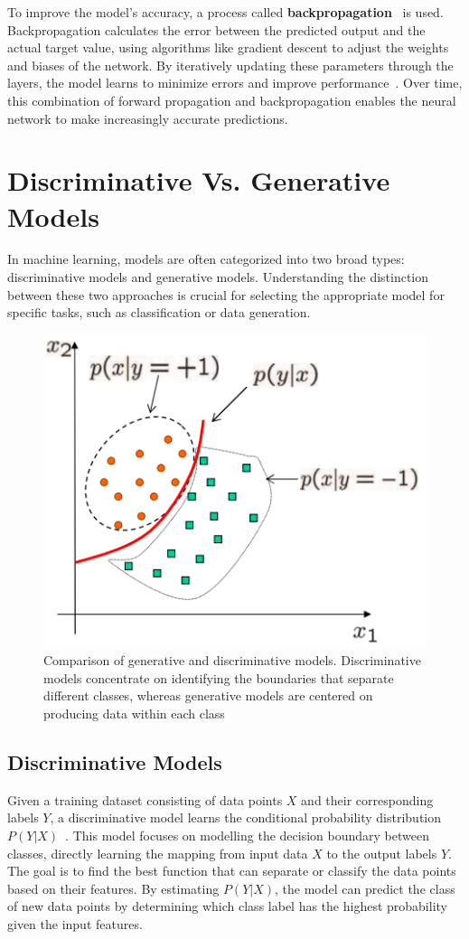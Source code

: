 \documentclass[12pt,DIV14,BCOR12mm,a4paper,footinclude=false,headinclude,parskip=half-,twoside,openright,cleardoublepage=empty,toc=index,bibliography=totoc,listof=totoc]{scrreprt}
\numberwithin{equation}{chapter}
\begin{document}
To improve the model's accuracy, a process called \textbf{backpropagation}~\cite{lecun1988theoretical} is used. Backpropagation calculates the error between the predicted output and the actual target value, using algorithms like gradient descent to adjust the weights and biases of the network. By iteratively updating these parameters through the layers, the model learns to minimize errors and improve performance~\cite{rumelhart1986learning}. Over time, this combination of forward propagation and backpropagation enables the neural network to make increasingly accurate predictions.
\section{Discriminative Vs. Generative Models}
In machine learning, models are often categorized into two broad types: discriminative models and generative models. Understanding the distinction between these two approaches is crucial for selecting the appropriate model for specific tasks, such as classification or data generation.

\begin{figure}
	\centering
	\includegraphics[scale=.7]{../media/Discriminative Vs Generative.PNG}
	\caption{Comparison of generative and discriminative models. Discriminative models concentrate on identifying the boundaries that separate different classes, whereas generative models are centered on producing data within each class~\cite{tu2007learning}}
	\label{disc_vs_gen}
\end{figure}

\subsection{Discriminative Models}
Given a training dataset consisting of data points \(X\) and their corresponding labels \(Y\), a discriminative model learns the conditional probability distribution \(P(Y | X)\)~\cite{deng2016deep}. This model focuses on modelling the decision boundary between classes, directly learning the mapping from input data \(X\)  to the output labels \(Y\). The goal is to find the best function that can separate or classify the data points based on their features. By estimating \(P(Y | X)\), the model can predict the class of new data points by determining which class label has the highest probability given the input features.
\end{document}
